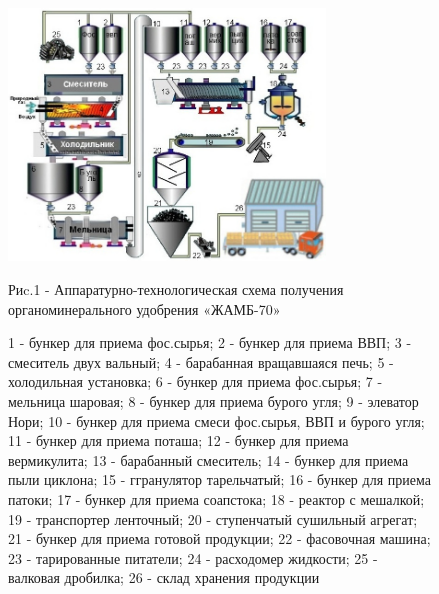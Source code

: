 \begin{figure}[H]
	\centering
	\includegraphics[width=0.75\textwidth]{assets/1081}
	\caption*{Риc.1 - Аппаратурно-технологическая схема получения органоминерального удобрения «ЖАМБ-70»}
	\caption*{1 - бункер для приема фос.сырья; 2 - бункер для приема ВВП; 3 -
смеситель двух вальный; 4 - барабанная вращавшаяся печь; 5 - холодильная
установка; 6 - бункер для приема фос.сырья; 7 - мельница шаровая; 8 -
бункер для приема бурого угля; 9 - элеватор Нори; 10 - бункер для приема
смеси фос.сырья, ВВП и бурого угля; 11 - бункер для приема поташа; 12 -
бункер для приема вермикулита; 13 - барабанный смеситель; 14 - бункер
для приема пыли циклона; 15 - ггранулятор тарельчатый; 16 - бункер для
приема патоки; 17 - бункер для приема соапстока; 18 - реактор с
мешалкой; 19 - транспортер ленточный; 20 - ступенчатый сушильный
агрегат; 21 - бункер для приема готовой продукции; 22 - фасовочная
машина; 23 - тарированные питатели; 24 - расходомер жидкости; 25 -
валковая дробилка; 26 - склад хранения продукции}
\end{figure}

